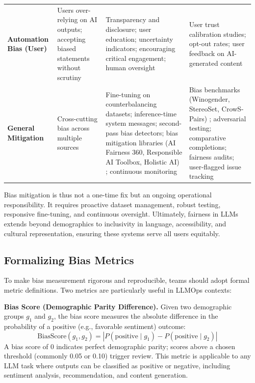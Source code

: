 {\begin{xltabular}{\linewidth}{@{}>{\raggedright\arraybackslash}p{2.8cm}>{\raggedright\arraybackslash}X>{\raggedright\arraybackslash}X>{\raggedright\arraybackslash}X@{}}
\addlinespace[2pt]
\textbf{Automation Bias (User)} & Users over-relying on AI outputs; accepting biased statements without scrutiny \cite{euai2025} & Transparency and disclosure; user education; uncertainty indicators; encouraging critical engagement; human oversight & User trust calibration studies; opt-out rates; user feedback on AI-generated content \\
\addlinespace[2pt]
\textbf{General Mitigation} & Cross-cutting bias across multiple sources & Fine-tuning on counterbalancing datasets; inference-time system messages; second-pass bias detectors; bias mitigation libraries (AI Fairness 360, Responsible AI Toolbox, Holistic AI) \cite{holisticai2025}; continuous monitoring & Bias benchmarks (Winogender, StereoSet, CrowS-Pairs) \cite{aclanthology2023}; adversarial testing; comparative completions; fairness audits; user-flagged issue tracking \\
\end{xltabular}
}

Bias mitigation is thus not a one-time fix but an ongoing operational responsibility. It requires proactive dataset management, robust testing, responsive fine-tuning, and continuous oversight. Ultimately, fairness in LLMs extends beyond demographics to inclusivity in language, accessibility, and cultural representation, ensuring these systems serve all users equitably.

\subsection{Formalizing Bias Metrics}\label{sec:ch11_bias_metrics}

To make bias measurement rigorous and reproducible, teams should adopt formal metric definitions. Two metrics are particularly useful in LLMOps contexts:

\textbf{Bias Score (Demographic Parity Difference).} Given two demographic groups $g_1$ and $g_2$, the bias score measures the absolute difference in the probability of a positive (e.g., favorable sentiment) outcome:
\begin{equation}\label{eq:ch11_bias_score}
\text{BiasScore}(g_1, g_2) = \left| P(\text{positive} \mid g_1) - P(\text{positive} \mid g_2) \right|
\end{equation}
A bias score of 0 indicates perfect demographic parity; scores above a chosen threshold (commonly 0.05 or 0.10) trigger review. This metric is applicable to any LLM task where outputs can be classified as positive or negative, including sentiment analysis, recommendation, and content generation.

